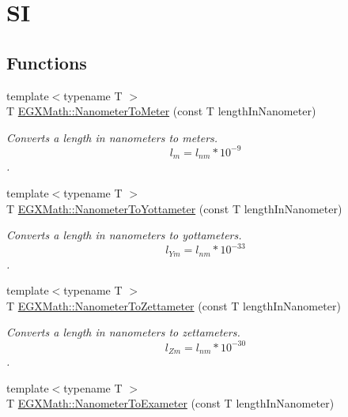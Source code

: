 \hypertarget{group___e_g_x_math-_conversions-_length_conversions-_nanometer-_s_i}{}\section{SI}
\label{group___e_g_x_math-_conversions-_length_conversions-_nanometer-_s_i}
\subsection*{Functions}
\begin{DoxyCompactItemize}
\item 
{\footnotesize template$<$typename T $>$ }\\T \mbox{\hyperlink{group___e_g_x_math-_conversions-_length_conversions-_nanometer-_s_i_ga2ceddcda2954e4bb6cf1216ce4edc160}{E\+G\+X\+Math\+::\+Nanometer\+To\+Meter}} (const T length\+In\+Nanometer)
\begin{DoxyCompactList}\small\item\em Converts a length in nanometers to meters. \[ l_{m}=l_{nm} * 10^{-9} \]. \end{DoxyCompactList}\item 
{\footnotesize template$<$typename T $>$ }\\T \mbox{\hyperlink{group___e_g_x_math-_conversions-_length_conversions-_nanometer-_s_i_ga986e80d7ab490fdc59ebbc2d7473bda3}{E\+G\+X\+Math\+::\+Nanometer\+To\+Yottameter}} (const T length\+In\+Nanometer)
\begin{DoxyCompactList}\small\item\em Converts a length in nanometers to yottameters. \[ l_{Ym}=l_{nm} * 10^{-33} \]. \end{DoxyCompactList}\item 
{\footnotesize template$<$typename T $>$ }\\T \mbox{\hyperlink{group___e_g_x_math-_conversions-_length_conversions-_nanometer-_s_i_ga3306731dd581f22ad9203923e4a03d2a}{E\+G\+X\+Math\+::\+Nanometer\+To\+Zettameter}} (const T length\+In\+Nanometer)
\begin{DoxyCompactList}\small\item\em Converts a length in nanometers to zettameters. \[ l_{Zm}=l_{nm} * 10^{-30} \]. \end{DoxyCompactList}\item 
{\footnotesize template$<$typename T $>$ }\\T \mbox{\hyperlink{group___e_g_x_math-_conversions-_length_conversions-_nanometer-_s_i_ga27316ac700548a2bcf058bb4f098f4e2}{E\+G\+X\+Math\+::\+Nanometer\+To\+Exameter}} (const T length\+In\+Nanometer)

\end{DoxyCompactItemize}
